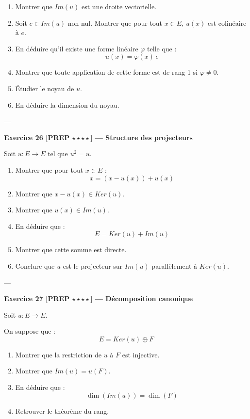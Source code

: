 \documentclass[11pt,a4paper]{article}
\begin{document}
\begin{enumerate}
\item Montrer que $Im(u)$ est une droite vectorielle.
\item Soit $e \in Im(u)$ non nul. Montrer que pour tout $x \in E$, $u(x)$ est colinéaire à $e$.
\item En déduire qu’il existe une forme linéaire $\varphi$ telle que :
\[
u(x) = \varphi(x)\, e
\]
\item Montrer que toute application de cette forme est de rang 1 si $\varphi \neq 0$.
\item Étudier le noyau de $u$.
\item En déduire la dimension du noyau.
\end{enumerate}

---

\textbf{Exercice 26 [PREP $\star\star\star\star$] — Structure des projecteurs}

Soit $u : E \to E$ tel que $u^2 = u$.

\begin{enumerate}
\item Montrer que pour tout $x \in E$ :
\[
x = (x - u(x)) + u(x)
\]
\item Montrer que $x - u(x) \in Ker(u)$.
\item Montrer que $u(x) \in Im(u)$.
\item En déduire que :
\[
E = Ker(u) + Im(u)
\]
\item Montrer que cette somme est directe.
\item Conclure que $u$ est le projecteur sur $Im(u)$ parallèlement à $Ker(u)$.
\end{enumerate}

---

\textbf{Exercice 27 [PREP $\star\star\star\star$] — Décomposition canonique}

Soit $u : E \to E$.

On suppose que :
\[
E = Ker(u) \oplus F
\]

\begin{enumerate}
\item Montrer que la restriction de $u$ à $F$ est injective.
\item Montrer que $Im(u) = u(F)$.
\item En déduire que :
\[
\dim(Im(u)) = \dim(F)
\]
\item Retrouver le théorème du rang.
\end{enumerate}
\end{document}

